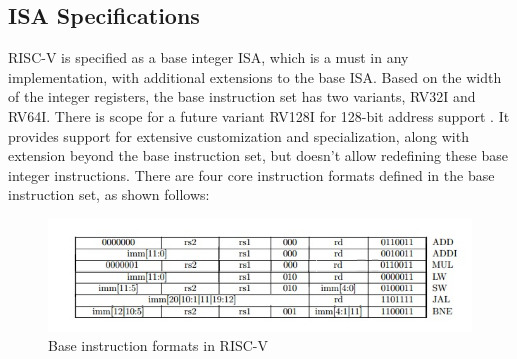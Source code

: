 \subsection{ISA Specifications}
 \label{sect6_1_2}
RISC-V is specified as a base integer ISA, which is a must in any implementation, with additional extensions to the base ISA. Based on the width of the integer registers, the base instruction set has two variants, RV32I and RV64I. There is scope for a future variant RV128I for 128-bit address support \cite{riscv_isa_manual}. It provides support for extensive customization and specialization, along with extension beyond the base instruction set, but doesn't allow redefining these base integer instructions. \newline\newline
There are four core instruction formats defined in the base instruction set, as shown follows:
\begin{figure}[h!]
\centering
\includegraphics[width=\linewidth]{figures/Instruction_Formats.jpg}
\caption{Base instruction formats in RISC-V \cite{riscv_tools_bootcamp}}
\label{fig:riscv1}
\end{figure}

